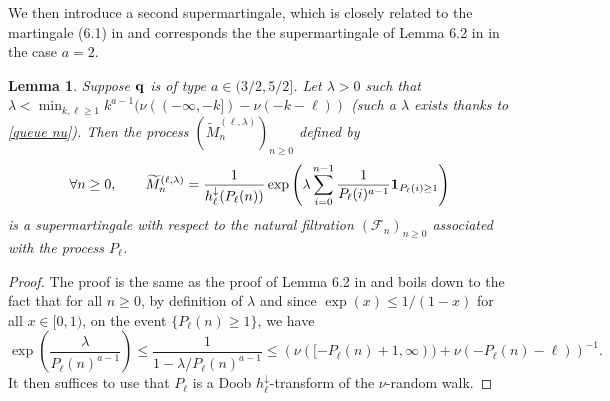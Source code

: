 \documentclass[11pt]{article}
\newtheorem{lemma}[theorem]{Lemma}
\numberwithin{equation}{section}
\begin{document}
We then introduce a second supermartingale, which is closely related to the martingale (6.1) in \cite{Kam23} and corresponds the the supermartingale of Lemma 6.2 in \cite{Kam23} in the case $a=2$.
\begin{lemma}\label{lemme martingale 2}
	Suppose ${\bf q}$ is of type $a \in (3/2,5/2]$. Let $\lambda>0$ such that $\lambda<\min_{k,\ell \ge 1} k^{a-1} (\nu((-\infty,-k])-\nu(-k-\ell))$ (such a $\lambda$ exists thanks to \eqref{queue nu}). Then the process  $(\widetilde{M}_n^{(\ell,\lambda)})_{n\ge 0}$ defined by
	$$
	\forall n\ge 0, \qquad
	\widetilde{M}^{(\ell,\lambda)}_n =
	\frac{1}{h^\downarrow_\ell(P_\ell(n))}
	\exp\left(
	\lambda \sum_{i=0}^{n-1} \frac{1}{P_\ell(i)^{a-1}} {\bf 1}_{P_\ell(i) \ge 1}
	\right)
	$$
	is a supermartingale with respect to the natural filtration $(\mathcal{F}_n)_{n\ge 0}$ associated with the process $P_\ell$. 
\end{lemma}
\begin{proof}
The proof is the same as the proof of Lemma 6.2 in \cite{Kam23} and boils down to the fact that for all $n\ge 0$, by definition of $\lambda$ and since $\exp(x) \le 1/(1-x)$ for all $x \in [0,1)$, on the event $\{P_\ell(n) \ge 1\}$, we have
$$
\exp\left( 
\frac{\lambda}{P_\ell(n)^{a-1}}
\right)
\le \frac{1}{1-\lambda/P_\ell(n)^{a-1}}
\le \left( \nu([-P_\ell(n)+1,\infty))+ \nu(-P_\ell(n) -\ell) \right)^{-1}.
$$
It then suffices to use that $P_\ell$ is a Doob $h_\ell^\downarrow$-transform of the $\nu$-random walk.
\end{proof}
\end{document}
